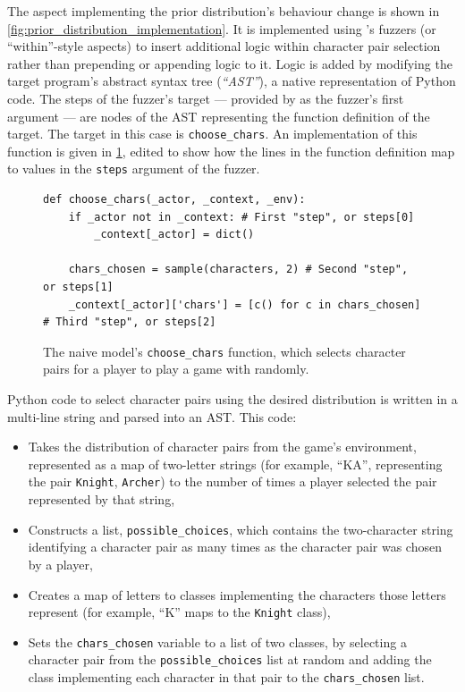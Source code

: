 The aspect implementing the prior distribution's behaviour change is shown in
\cref{fig:prior_distribution_implementation}. It is implemented using \pdsf{}'s
fuzzers (or ``within''-style aspects) to insert additional logic within
character pair selection rather than prepending or appending logic to it. Logic
is added by modifying the target program's abstract syntax tree (\emph{``AST''}),
a native representation of Python code. The steps of the fuzzer's target ---
provided by \pdsf{} as the fuzzer's first argument --- are nodes of the AST
representing the function definition of the target. The target in this case is
\lstinline{choose_chars}. An implementation of this function is given in
\cref{fig:choose_chars_implementation_annotated_with_steps}, edited to show how
the lines in the function definition map to values in the \lstinline{steps}
argument of the fuzzer.

\begin{figure}
  \begin{lstlisting}[style=footnotesize_python]
def choose_chars(_actor, _context, _env):
    if _actor not in _context: # First "step", or steps[0]
        _context[_actor] = dict()

    chars_chosen = sample(characters, 2) # Second "step", or steps[1]
    _context[_actor]['chars'] = [c() for c in chars_chosen] # Third "step", or steps[2]
  \end{lstlisting}
  \caption{The naive model's \lstinline{choose_chars} function, which selects
  character pairs for a player to play a game with randomly.}
  \label{fig:choose_chars_implementation_annotated_with_steps}
\end{figure}

Python code to select character pairs using the desired distribution is written
in a multi-line string and parsed into an AST. This code:

\begin{itemize}
\item Takes the distribution of character pairs from the game's environment,
represented as a map of two-letter strings (for example, ``KA'', representing
the pair \lstinline{Knight}, \lstinline{Archer}) to the number of times a player
selected the pair represented by that string,
\item Constructs a list, \lstinline{possible_choices}, which contains the
two-character string identifying a character pair as many times as the character
pair was chosen by a player,
\item Creates a map of letters to classes implementing the characters those
letters represent (for example, ``K'' maps to the \lstinline{Knight} class),
\item Sets the \lstinline{chars_chosen} variable to a list of two classes, by
selecting a character pair from the \lstinline{possible_choices} list at random
and adding the class implementing each character in that pair to the
\lstinline{chars_chosen} list.
\end{itemize}

